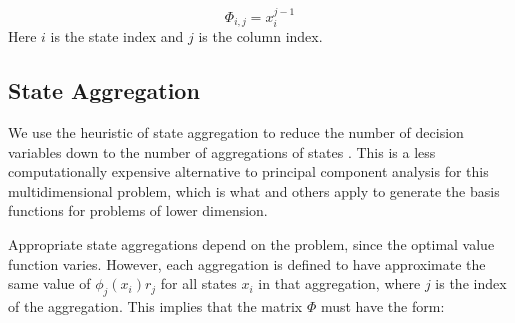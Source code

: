 \documentclass[conference]{IEEEtran}
\begin{document}
	\begin{displaymath}
        \Phi_{i,j}=x_{i}^{j-1}
    \end{displaymath} Here $i$ is the state index and $j$ is the column index. %



 \subsection{State Aggregation}
    
    We use the heuristic of state aggregation to reduce the number of decision variables down to the number of aggregations of states \cite{5717627}. This is a less computationally expensive alternative to principal component analysis for this multidimensional problem, which is what \cite{PCA2015} and others apply to generate the basis functions for problems of lower dimension.%
    
    Appropriate state aggregations depend on the problem, since the optimal value function varies. %
    However, each aggregation is defined to have approximate the same value of $\phi_{j}(x_{i})r_{j}$ for all states $x_{i}$ in that aggregation, where $j$ is the index of the aggregation. This implies that the matrix $\Phi$ must have the form:
    
\end{document}
